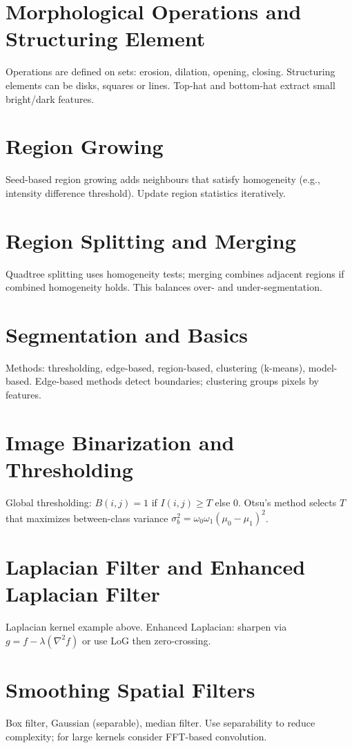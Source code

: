 \documentclass[12pt,a4paper]{article}
\begin{document}
\section{Morphological Operations and Structuring Element}
Operations are defined on sets: erosion, dilation, opening, closing. Structuring elements can be disks, squares or lines. Top-hat and bottom-hat extract small bright/dark features.

\section{Region Growing}
Seed-based region growing adds neighbours that satisfy homogeneity (e.g., intensity difference threshold). Update region statistics iteratively.

\section{Region Splitting and Merging}
Quadtree splitting uses homogeneity tests; merging combines adjacent regions if combined homogeneity holds. This balances over- and under-segmentation.

\section{Segmentation and Basics}
Methods: thresholding, edge-based, region-based, clustering (k-means), model-based. Edge-based methods detect boundaries; clustering groups pixels by features.

\section{Image Binarization and Thresholding}
Global thresholding: $B(i,j)=1$ if $I(i,j)\ge T$ else 0. Otsu's method selects $T$ that maximizes between-class variance $\sigma_b^2=\omega_0\omega_1(\mu_0-\mu_1)^2$.

\section{Laplacian Filter and Enhanced Laplacian Filter}
Laplacian kernel example above. Enhanced Laplacian: sharpen via $g=f-\lambda(\nabla^2 f)$ or use LoG then zero-crossing.

\section{Smoothing Spatial Filters}
Box filter, Gaussian (separable), median filter. Use separability to reduce complexity; for large kernels consider FFT-based convolution.
\end{document}
